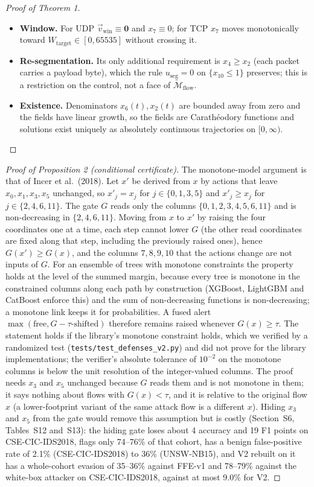\begin{proof}[Proof of Theorem 1]
\begin{itemize}
    \item \textbf{Window.} For UDP $\vec v_{\text{win}}\equiv\mathbf0$ and $x_7\equiv0$; for TCP $x_7$ moves monotonically toward $W_{\text{target}}\in[0,65535]$ without crossing it.
    \item \textbf{Re-segmentation.} Its only additional requirement is $x_4\ge x_2$ (each packet carries a payload byte), which the rule $u_{\text{seg}}=0$ on $\{x_{10}\le1\}$ preserves; this is a restriction on the control, not a face of $\widetilde{\mathcal M}_{\text{flow}}$.
    \item \textbf{Existence.} Denominators $x_6(t),x_2(t)$ are bounded away from zero and the fields have linear growth, so the fields are Carath\'eodory functions and solutions exist uniquely as absolutely continuous trajectories on $[0,\infty)$.
\end{itemize}
\end{proof}

\begin{proof}[Proof of Proposition 2 (conditional certificate)]
The monotone-model argument is that of Incer et al.\ (2018). Let $x'$ be derived from $x$ by actions that leave $x_0,x_1,x_3,x_5$ unchanged, so $x'_j=x_j$ for $j\in\{0,1,3,5\}$ and $x'_j\ge x_j$ for $j\in\{2,4,6,11\}$. The gate $G$ reads only the columns $\{0,1,2,3,4,5,6,11\}$ and is non-decreasing in $\{2,4,6,11\}$. Moving from $x$ to $x'$ by raising the four coordinates one at a time, each step cannot lower $G$ (the other read coordinates are fixed along that step, including the previously raised ones), hence $G(x')\ge G(x)$, and the columns $7,8,9,10$ that the actions change are not inputs of $G$. For an ensemble of trees with monotone constraints the property holds at the level of the summed margin, because every tree is monotone in the constrained columns along each path by construction (XGBoost, LightGBM and CatBoost enforce this) and the sum of non-decreasing functions is non-decreasing; a monotone link keeps it for probabilities. A fused alert $\max(\text{free},G-\tau\text{-shifted})$ therefore remains raised whenever $G(x)\ge\tau$. The statement holds if the library's monotone constraint holds, which we verified by a randomized test (\texttt{tests/test\_defenses\_v2.py}) and did not prove for the library implementations; the verifier's absolute tolerance of $10^{-2}$ on the monotone columns is below the unit resolution of the integer-valued columns. The proof needs $x_3$ and $x_5$ unchanged because $G$ reads them and is not monotone in them; it says nothing about flows with $G(x)<\tau$, and it is relative to the original flow $x$ (a lower-footprint variant of the same attack flow is a different $x$). Hiding $x_3$ and $x_5$ from the gate would remove this assumption but is costly (Section~S6, Tables~S12 and~S13): the hiding gate loses about 4 accuracy and 19 F1 points on CSE-CIC-IDS2018, flags only 74--76\% of that cohort, has a benign false-positive rate of 2.1\% (CSE-CIC-IDS2018) to 36\% (UNSW-NB15), and V2 rebuilt on it has a whole-cohort evasion of 35--36\% against FFE-v1 and 78--79\% against the white-box attacker on CSE-CIC-IDS2018, against at most 9.0\% for V2.
\end{proof}

